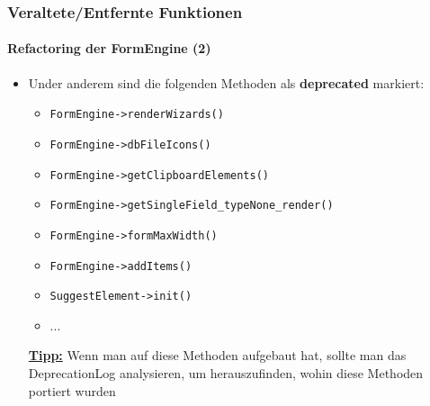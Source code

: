 \begin{frame}[fragile]
	\frametitle{Veraltete/Entfernte Funktionen}
	\framesubtitle{Refactoring der FormEngine (2)}

	\begin{itemize}

		\item Under anderem sind die folgenden Methoden als \textbf{deprecated} markiert:

			\begin{itemize}
				\item \texttt{FormEngine->renderWizards()}
				\item \texttt{FormEngine->dbFileIcons()}
				\item \texttt{FormEngine->getClipboardElements()}
				\item \texttt{FormEngine->getSingleField\_typeNone\_render()}
				\item \texttt{FormEngine->formMaxWidth()}
				\item \texttt{FormEngine->addItems()}
				\item \texttt{SuggestElement->init()}
				\item ...
			\end{itemize}

		\small
			\underline{\textbf{Tipp:}}
			Wenn man auf diese Methoden aufgebaut hat, sollte man das DeprecationLog
			analysieren, um herauszufinden, wohin diese Methoden portiert wurden
		\normalsize

	\end{itemize}

\end{frame}


